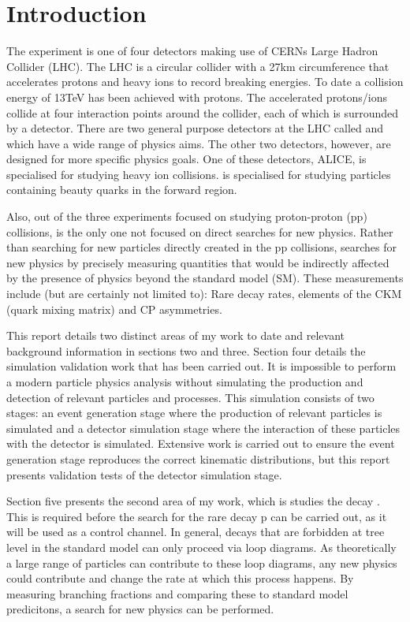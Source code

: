 
\section{Introduction}
\label{sec:Introduction}
The \lhcb experiment is one of four detectors making use of CERNs Large Hadron Collider (LHC). The LHC is a circular collider with a 27km circumference that accelerates protons and heavy ions to record breaking energies.  To date a collision energy of 13TeV has been achieved with protons.  The accelerated protons/ions collide at four interaction points around the collider, each of which is surrounded by a detector.  There are two general purpose detectors at the LHC called \atlas and \cms which have a wide range of physics aims.  The other two detectors, however, are designed for more specific physics goals.  One of these detectors, ALICE, is specialised for studying heavy ion collisions.  \lhcb is specialised for studying particles containing beauty quarks in the forward region.

Also, out of the three experiments focused on studying proton-proton (pp) collisions, \lhcb is the only one not focused on direct searches for new physics.  Rather than searching for new particles directly created in the pp collisions, \lhcb searches for new physics by precisely measuring quantities that would be indirectly affected by the presence of physics beyond the standard model (SM).  These measurements include (but are certainly not limited to): Rare decay rates, elements of the CKM (quark mixing matrix) and CP asymmetries.

This report details two distinct areas of my work to date and relevant background information in sections two and three.  Section four details the simulation validation work that has been carried out.  It is impossible to perform a modern particle physics analysis without simulating the production and detection of relevant particles and processes.  This simulation consists of two stages: an event generation stage where the production of relevant particles is simulated and a detector simulation stage where the interaction of these particles with the \lhcb detector is simulated.  Extensive work is carried out to ensure the event generation stage reproduces the correct kinematic distributions, but this report presents validation tests of the detector simulation stage.

Section five presents the second area of my work, which is studies the decay \Bd \to \Kstar \etaz.   This is required before the search for the rare decay \Lb \to p \Km \etaz can be carried out, as it will be used as a control channel.  In general, decays that are forbidden at tree level in the standard model can only proceed via loop diagrams.  As theoretically a large range of particles can contribute to these loop diagrams, any new physics could contribute and change the rate at which this process happens.  By measuring branching fractions and comparing these to standard model predicitons, a search for new physics can be performed.




